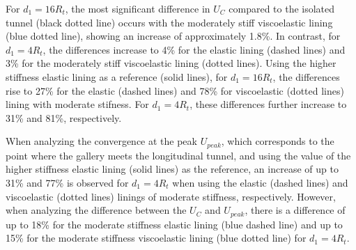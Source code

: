 \documentclass[a4paper,fleqn]{cas-sc}
\begin{document}
\FloatBarrier
For $d_1 = 16R_t$, the most significant difference in $U_{C}$ compared to the isolated tunnel (black dotted line) occurs with the moderately stiff viscoelastic lining (blue dotted line), showing an increase of approximately 1.8\%. In contrast, for $d_1 = 4R_t$, the differences increase to 4\% for the elastic lining (dashed lines) and 3\% for the moderately stiff viscoelastic lining (dotted lines). Using the higher stiffness elastic lining as a reference (solid lines), for $d_1 = 16R_t$, the differences rise to 27\% for the elastic (dashed lines) and 78\% for viscoelastic (dotted lines) lining with moderate stifness. For $d_1 = 4R_t$, these differences further increase to 31\% and 81\%, respectively.

When analyzing the convergence at the peak $U_{peak}$, which corresponds to the point where the gallery meets the longitudinal tunnel, and using the value of the higher stiffness elastic lining (solid lines) as the reference, an increase of up to 31\% and 77\% is observed for $d_1=4R_t$ when using the elastic (dashed lines) and viscoelastic (dotted lines) linings of moderate stiffness, respectively. However, when analyzing the difference between the $U_{C}$ and $U_{peak}$, there is a difference of up to 18\% for the moderate stiffness elastic lining (blue dashed line) and up to 15\% for the moderate stiffness viscoelastic lining (blue dotted line) for $d_1=4R_t$.
\end{document}
